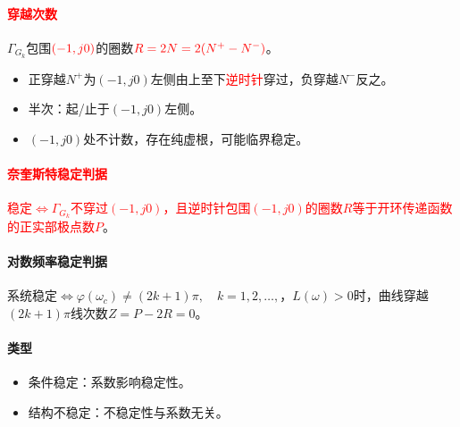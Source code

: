 \documentclass[
12pt, %
a4paper, 
oneside, %
]{scrartcl}
\begin{document}
\paragraph{\textcolor{red}{穿越次数}}
$ \Gamma_{G_k} $包围$ \textcolor{red}{(-1, j 0)} $的圈数$ \textcolor{red}{R = 2N = 2(N^+ - N^-)} $。
\begin{itemize}
\item 正穿越$ N^+ $为$ (-1, j 0) $左侧由上至下\textcolor{red}{逆时针}穿过，负穿越$ N^- $反之。
\item 半次：起/止于$ (-1, j 0) $左侧。
\item $ (-1, j 0) $处不计数，存在纯虚根，可能临界稳定。
\end{itemize}
\paragraph{\textcolor{red}{奈奎斯特稳定判据}}
\textcolor{red}{稳定$ \Leftrightarrow $$ \Gamma_{G_k} $不穿过$ (-1, j 0) $，且逆时针包围$ (-1, j 0) $的圈数$ R $等于开环传递函数的正实部极点数$ P $}。
\paragraph{对数频率稳定判据}
系统稳定$ \Leftrightarrow $$ \varphi(\omega_c) \neq (2k + 1)\pi, \quad k = 1, 2, \dots, $，$ L(\omega) > 0 $时，曲线穿越$ (2k + 1)\pi $线次数$ Z = P - 2R = 0 $。
\paragraph{类型}
\begin{itemize}
\item 条件稳定：系数影响稳定性。
\item 结构不稳定：不稳定性与系数无关。
\end{itemize}
\end{document}
